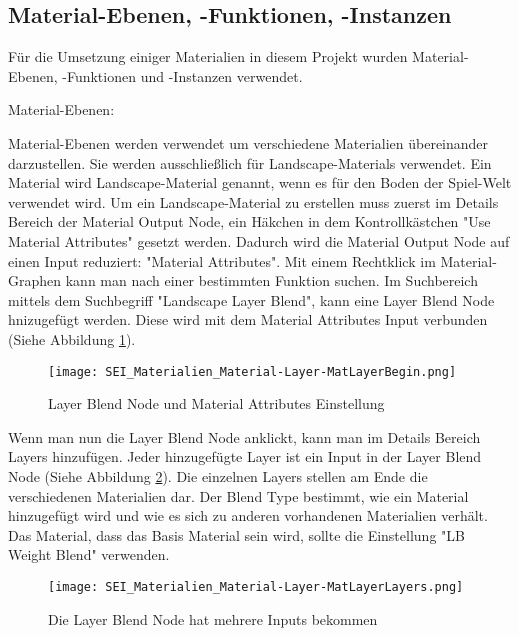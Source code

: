 \subsection{Material-Ebenen, -Funktionen, -Instanzen}
\label{sec:mat_lay_func_ins}

Für die Umsetzung einiger Materialien in diesem Projekt wurden Material-Ebenen, -Funktionen und -Instanzen verwendet.

Material-Ebenen\citep{ue:mat_landscape}:

Material-Ebenen werden verwendet um verschiedene Materialien übereinander darzustellen. Sie werden ausschließlich für
Landscape-Materials verwendet. Ein Material wird Landscape-Material genannt, wenn es für den Boden der Spiel-Welt
verwendet wird. Um ein Landscape-Material zu erstellen muss zuerst im Details Bereich der Material Output Node, ein
Häkchen in dem Kontrollkästchen "Use Material Attributes" gesetzt werden. Dadurch wird die Material Output Node auf
einen Input reduziert: "Material Attributes". Mit einem Rechtklick im Material-Graphen kann man nach einer bestimmten
Funktion suchen. Im Suchbereich mittels dem Suchbegriff "Landscape Layer Blend", kann eine Layer Blend Node hnizugefügt
werden. Diese wird mit dem Material Attributes Input verbunden (Siehe Abbildung \ref{picture:layer_blend}).

\begin{figure}[h]
    \centering
    \texttt{[image: SEI\_Materialien\_Material-Layer-MatLayerBegin.png]}
    \caption{Layer Blend Node und Material Attributes Einstellung}
    \label{picture:layer_blend}
\end{figure}

Wenn man nun die Layer Blend Node anklickt, kann man im Details Bereich Layers hinzufügen. Jeder hinzugefügte Layer
ist ein Input in der Layer Blend Node (Siehe Abbildung \ref{picture:layers}). Die einzelnen Layers stellen am Ende die verschiedenen
Materialien dar. Der Blend Type bestimmt, wie ein Material hinzugefügt wird und wie es sich zu anderen vorhandenen
Materialien verhält. Das Material, dass das Basis Material sein wird, sollte die Einstellung "LB Weight Blend"
verwenden.

\begin{figure}[h]
    \centering
    \texttt{[image: SEI\_Materialien\_Material-Layer-MatLayerLayers.png]}
    \caption{Die Layer Blend Node hat mehrere Inputs bekommen}
    \label{picture:layers}
\end{figure}

